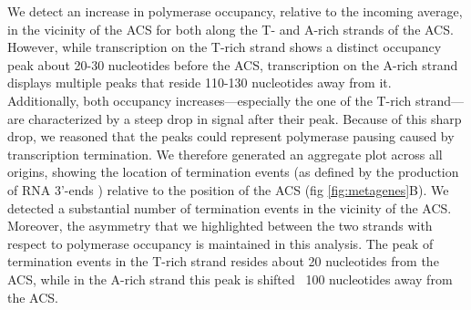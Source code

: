 We detect an increase in polymerase occupancy, relative to the incoming average, in the vicinity of the ACS for both along the T- and A-rich strands of the ACS.
However, while transcription on the T-rich strand shows a distinct occupancy peak about 20-30 nucleotides before the ACS, transcription on the A-rich strand displays multiple peaks that reside 110-130 nucleotides away from it.
 Additionally, both occupancy increases—especially the one of the T-rich strand—are characterized by a steep drop in signal after their peak. Because of this sharp drop, we reasoned that the peaks could represent polymerase pausing caused by transcription termination. 
We therefore generated an aggregate plot across all origins, showing the location of termination events (as defined by the production of RNA 3’-ends \cite{wilkening:2013:efficient}) relative to the position of the ACS (fig \ref{fig:metagenes}B). 
We detected a substantial number of termination events in the vicinity of the ACS. 
Moreover, the asymmetry that we highlighted between the two strands with respect to polymerase occupancy is maintained in this analysis. 
The peak of termination events in the T-rich strand resides about 20 nucleotides from the ACS, while in the A-rich strand this peak is shifted ~100 nucleotides away from the ACS. 
